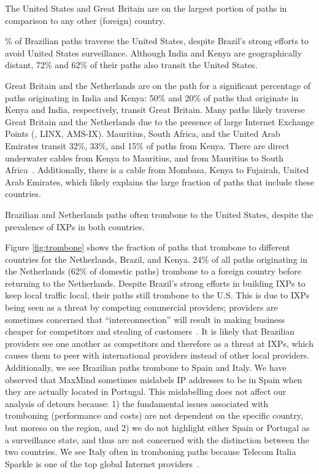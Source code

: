 \begin{finding}
The United States and Great Britain are on the largest portion of paths in comparison to any other (foreign) country.
\end{finding}
\% of Brazilian paths traverse the United States, despite Brazil's
strong efforts to avoid United States surveillance.  Although India and
Kenya are geographically distant, 72\% and 62\% of their paths also transit
the United States.

Great Britain and the Netherlands are on the path for a significant
percentage of paths originating in India and Kenya: 50\% and 20\% of
paths that originate in Kenya and India, respectively, transit Great
Britain.   Many paths likely traverse Great Britain and the Netherlands due to
the presence of large Internet Exchange Points (\ie, LINX, AMS-IX).
Mauritius, South Africa, and the United Arab Emirates transit 32\%,
33\%, and 15\% of paths from Kenya.  There are direct underwater cables
from Kenya to Mauritius, and from Mauritius to South
Africa~\cite{cablemap}.  Additionally, there is a cable from Mombasa,
Kenya to Fujairah, United Arab Emirates, which likely explains the large
fraction of paths that include these countries. 



\begin{finding}
Brazilian and Netherlands paths often trombone to the United States, despite the prevalence of IXPs in both countries.
\end{finding}
\noindent
Figure \ref{fig:trombone}
shows the fraction of paths that trombone to
different countries for the Netherlands, Brazil, and Kenya. 24\% of
all paths originating in the Netherlands (62\% of domestic paths)
trombone to a foreign country before returning to the
Netherlands. Despite Brazil's strong efforts in building IXPs to keep
local traffic local, 
their paths still trombone to the U.S.  This is due to IXPs being seen
as a threat by competing commercial providers; providers are sometimes
concerned that ``interconnection'' will result in making business
cheaper for competitors and stealing of customers~\cite{ixp_policy}.
It is likely that Brazilian providers see one another as competitors and therefore as a threat at IXPs, which causes them to peer with international providers instead of other local providers.  Additionally, we see Brazilian paths trombone to Spain and Italy. We have observed that MaxMind sometimes mislabels IP addresses to be in Spain when they are actually located in Portugal.  This mislabelling does not affect our analysis of detours because: 1) the fundamental issues associated with tromboning (performance and costs) are not dependent on the specific country, but moreso on the region, and 2) we do not highlight either Spain or Portugal as a surveillance state, and thus are not concerned with the distinction between the two countries.  We see Italy often in tromboning paths because Telecom Italia Sparkle is one of the top global Internet providers~\cite{bakers}.


